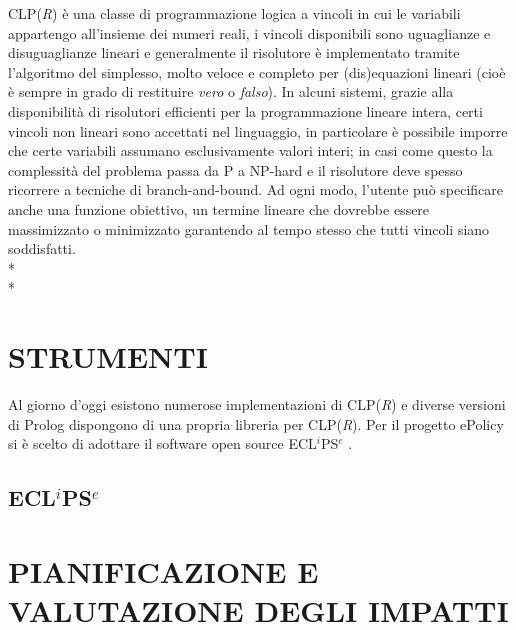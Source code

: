 \documentclass[12pt,a4paper,openright,twoside]{report}
\begin{document}
CLP(\emph{R}) è una classe di programmazione logica a vincoli in cui le variabili appartengo all'insieme dei numeri reali, i vincoli disponibili sono uguaglianze e disuguaglianze lineari e generalmente il risolutore è implementato tramite l'algoritmo del simplesso, molto veloce e completo per (dis)equazioni lineari (cioè è sempre in grado di restituire \emph{vero} o \emph{falso}). In alcuni sistemi, grazie alla disponibilità di risolutori efficienti per la programmazione lineare intera, certi vincoli non lineari sono accettati nel linguaggio, in particolare è possibile imporre che certe variabili assumano esclusivamente valori interi; in casi come questo la complessità del problema passa da P a NP-hard e il risolutore deve spesso ricorrere a tecniche di branch-and-bound. Ad ogni modo, l'utente può specificare anche una funzione obiettivo, un termine lineare che dovrebbe essere massimizzato o minimizzato garantendo al tempo stesso che tutti vincoli siano soddisfatti.\\*\\*


\section{STRUMENTI}
Al giorno d'oggi esistono numerose implementazioni di CLP(\emph{R}) \cite{inclpR} e diverse versioni di Prolog dispongono di una propria libreria per CLP(\emph{R}). Per il progetto ePolicy si è scelto di adottare il software open source  ECL$^i$PS$^e$ \cite{clpEclipse,fromLPtoCLPeclipse}.

\subsection{ECL$^i$PS$^e$}

\section{PIANIFICAZIONE E VALUTAZIONE DEGLI IMPATTI}
\end{document}
